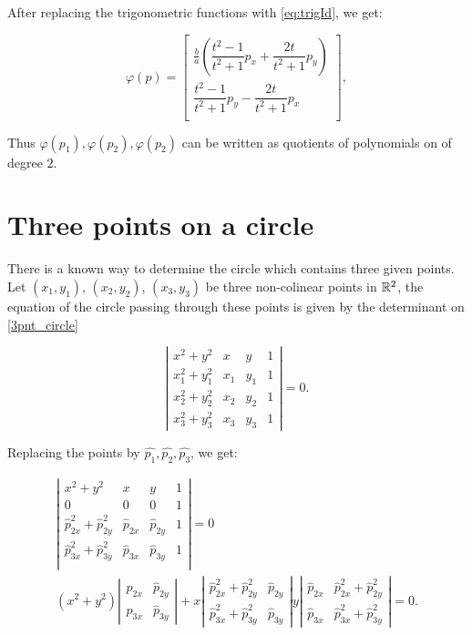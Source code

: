 After replacing the trigonometric functions with \autoref{eq:trigId}, we get:

\begin{equation}
\varphi(p)=\left[\begin{array}{c}
\frac{b}{a}(\dfrac{t^2-1}{t^2+1}p_x + \dfrac{2t}{t^2+1}p_y)\\
\dfrac{t^2-1}{t^2+1}p_y - \dfrac{2t}{t^2+1}p_x\\
\end{array}\right],
\end{equation}

Thus $\varphi(p_1), \varphi(p_2), \varphi(p_2)$ can be written as quotients of polynomials on of degree $2$.

\section{Three points on a circle}
There is a known way to determine the circle which contains three given points. 
Let $(x_1, y_1)$, $(x_2, y_2)$, $(x_3, y_3)$ be three non-colinear points in $\mathbb{R}^2$, the equation of the circle passing through these points is given by the determinant on \autoref{3pnt_circle}

\begin{equation}\label{3pnt_circle}
\left|
\begin{array}{cccc}
x^2+y^2&x&y&1\\
x_1^2+y_1^2&x_1&y_1&1\\
x_2^2+y_2^2&x_2&y_2&1\\
x_3^2+y_3^2&x_3&y_3&1
\end{array}
\right| = 0.
\end{equation}

Replacing the points by $\hat{p_1}, \hat{p_2}, \hat{p_3}$, we get:

\begin{eqnarray*}
\left|
\begin{array}{cccc}
x^2+y^2&x&y&1\\
0&0&0&1\\
\hat{p}_{2x}^2+\hat{p}_{2y}^2&\hat{p}_{2x}&\hat{p}_{2y}&1\\
\hat{p}_{3x}^2+\hat{p}_{3y}^2&\hat{p}_{3x}&\hat{p}_{3y}&1\\
\end{array}
\right| = 0\\
(x^2+y^2)\left|
\begin{array}{cc}
\hat{p}_{2x}& \hat{p}_{2y}\\
\hat{p}_{3x}& \hat{p}_{3y}
\end{array}\right|
+
x\left|
\begin{array}{cc}
	\hat{p}_{2x}^2+\hat{p}_{2y}^2& \hat{p}_{2y}\\
	\hat{p}_{3x}^2+\hat{p}_{3y}^2& \hat{p}_{3y}
\end{array}\right|
y\left|
\begin{array}{cc}
	\hat{p}_{2x}& \hat{p}_{2x}^2+\hat{p}_{2y}^2\\
	\hat{p}_{3x}& \hat{p}_{3x}^2+\hat{p}_{3y}^2
\end{array}\right|=0.
\end{eqnarray*}

